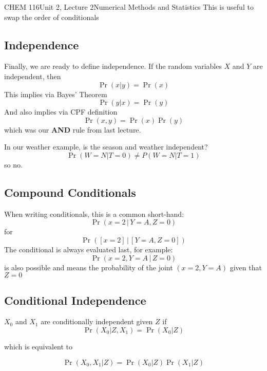\documentclass{article}
\begin{document}
\begin{tdoc}{CHEM 116}{Unit 2, Lecture 2}{Numerical Methods and Statistics}
This is useful to swap the order of conditionals

\subsection{Independence}
Finally, we are ready to define independence. If the random variables
$X$ and $Y$ are independent, then
\begin{equation}
\Pr(x|y) = \Pr(x)
\end{equation}
This implies via Bayes' Theorem
\begin{equation}
\Pr(y|x) = \Pr(y)
\end{equation}
And also implies via CPF definition
\begin{equation}
\Pr(x,y) = \Pr(x)\Pr(y)
\end{equation}
which was our {\bf AND} rule from last lecture.

\vspace{0.2cm}
In our weather example, is the season and weather independent?
\[
\Pr(W=N|T=0) \neq P(W=N|T=1)
\]
so no.


\subsection{Compound Conditionals}
When writing conditionals, this is a common short-hand:
\[
\Pr (x = 2\, | \,Y = A, Z = 0)
\]
for
\[
\Pr ([x = 2]\,|\, [Y = A, Z = 0])
\]
The conditional is always evaluated last, for example:
\[
\Pr(x = 2, Y = A\, | \,Z = 0)
\]
is also possible and means the probability of the joint $(x=2, Y=A)$
given that $Z = 0$



\subsection{Conditional Independence}
$X_0$ and $X_1$ are conditionally independent given $Z$ if
\begin{equation}
\Pr(X_0 | Z, X_1) = \Pr(X_0 | Z)
\end{equation}

which is equivalent to

\begin{equation}
\Pr(X_0, X_1 | Z) = \Pr(X_0 | Z)\Pr(X_1 | Z)
\end{equation}



\end{tdoc}
\end{document}
